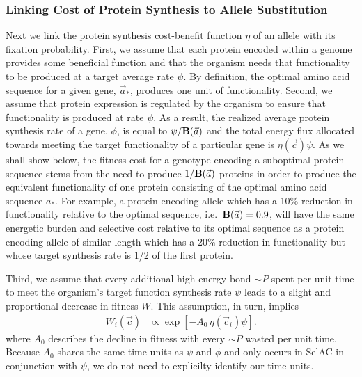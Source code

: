\documentclass{article}
\newcommand{\Func}{\ensuremath{\text{\textbf{B}}}\xspace}
\newcommand{\simP}{\ensuremath{\sim P}\xspace}
\newcommand{\selac}{SelAC\xspace}
\newcommand{\aopt}{\ensuremath{a_*}\xspace}
\newcommand{\aoptvec}{\ensuremath{\Vec{a}_*}\xspace}
\newcommand{\avec}{\ensuremath{\Vec{a}}\xspace}
\newcommand{\cveci}{\ensuremath{\cvec_i}\xspace}
\newcommand{\cvec}{\ensuremath{\Vec{c}}\xspace}
\begin{document}
\subsubsection*{Linking Cost of Protein Synthesis to Allele Substitution}
Next we link the protein synthesis cost-benefit function $\eta$ of an allele with its fixation probability.
First, we assume that each protein encoded within a genome provides some beneficial function and that the organism needs that functionality to be produced at a target average rate $\psi$.
By definition, the optimal amino acid sequence for a given gene, \aoptvec, produces one unit of functionality.
Second, we assume that protein expression is regulated by the organism to ensure that functionality is produced at rate $\psi$.
As a result, the realized average protein synthesis rate of a gene, $\phi$, is equal to $\psi/\Func(\avec)$ and the total energy flux allocated towards meeting the target functionality of a particular gene is $\eta(\cvec) \psi$.
As we shall show below, the fitness cost for a genotype encoding a suboptimal protein sequence stems from the need to produce $1/\Func(\avec)$ proteins in order to produce the equivalent functionality of one protein consisting of the optimal amino acid sequence \aopt.
For example, a protein encoding allele which has a 10\% reduction in functionality relative to the optimal sequence, i.e.~$\Func(\avec) = 0.9$, will have the same energetic burden and selective cost relative to its optimal sequence as a protein encoding allele of similar length which has a 20\% reduction in functionality but whose target synthesis rate is 1/2 of the first protein.


Third, we assume that every additional high energy bond \simP spent per unit time to meet the organism's target function synthesis rate $\psi$ leads to a slight and proportional decrease in fitness $W$.
This assumption, in turn, implies
\begin{align}
  W_i\left(\cvec\right) &\propto \exp\left[- A_0 \, \eta(\cveci) \psi\right].
\end{align}
where $A_0$ describes the decline in fitness with every \simP wasted per unit time.
Because $A_0$ shares the same time units as $\psi$ and $\phi$ and only occurs in \selac in conjunction with $\psi$, we do not need to explicilty identify our time units.
\end{document}
